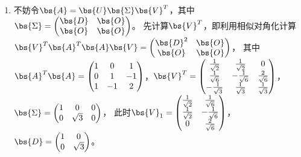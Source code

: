 \documentclass[12pt, a4paper, oneside, UTF8]{ctexbook}
\begin{document}
\begin{solution}
\begin{enumerate}[label=(\arabic*)]
        \item 不妨令$\bs{A}=\bs{U}\bs{\Sigma}\bs{V}^T$，其中$\bs{\Sigma}=\begin{pmatrix}
            \bs{D}& \bs{O}\\
            \bs{O}&\bs{O}
        \end{pmatrix}$。
        先计算$\bs{V}^T$，即利用相似对角化计算$\bs{V}^T\bs{A}^T\bs{A}\bs{V}=\begin{pmatrix}
            \bs{D}^2&\bs{O}\\
            \bs{O}&\bs{O}
        \end{pmatrix}$，
        其中$\bs{A}^T\bs{A}=\begin{pmatrix}
            1& 0&1\\
            0 & 1&-1 \\
            1&-1&2
        \end{pmatrix}$，$\bs{V}^T=\begin{pmatrix}
            \frac{1}{\sqrt{2}}&\frac{1}{\sqrt{2}}&0\\
            \frac{1}{\sqrt{6}}&-\frac{1}{\sqrt{6}}&\frac{2}{\sqrt{6}}\\
            -\frac{1}{\sqrt{3}}&\frac{1}{\sqrt{3}}&\frac{1}{\sqrt{3}}
        \end{pmatrix}$，$\bs{\Sigma}=\begin{pmatrix}
            1 & 0&0\\
            0 & \sqrt{3}&0 \\
        \end{pmatrix}$，
        此时$\bs{V}_1=\begin{pmatrix}
            \frac{1}{\sqrt{2}}&\frac{1}{\sqrt{6}}\\
            \frac{1}{\sqrt{2}}&-\frac{1}{\sqrt{6}}\\
            0&\frac{2}{\sqrt{6}}\\
        \end{pmatrix}
        $，$\bs{D}=\begin{pmatrix}
            1 & 0 \\
            0& \sqrt{3}\\
        \end{pmatrix}$。


\end{enumerate}
\end{solution}
\end{document}
